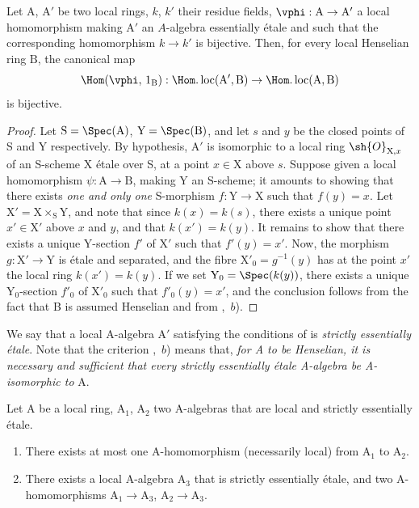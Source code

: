 \begin{lemma}[18.6.2]
\label{IV.18.6.2}
Let $\mathrm{A}$, $\mathrm{A}'$ be two local rings, $k$, $k'$ their residue fields,
$\vphi:\mathrm{A}\to\mathrm{A}'$ a local homomorphism making $\mathrm{A}'$ an $A$-algebra essentially \'{e}tale 
and such that the corresponding homomorphism $k\to k'$ is bijective.
Then, for every local Henselian ring $\mathrm{B}$, the canonical map
\[
  \Hom(\vphi,\,1_{\mathrm{B}}):\Hom.\operatorname{loc}(\mathrm{A}',\mathrm{B})\to\Hom.\operatorname{loc}(\mathrm{A},\mathrm{B})
\]
is bijective.
\end{lemma}

\begin{proof}
Let $\mathrm{S}=\Spec(\mathrm{A})$, $\mathrm{Y}=\Spec(\mathrm{B})$, and let $s$ and $y$ be the closed points of S and Y respectively.
By hypothesis, $\mathrm{A}'$ is isomorphic to a local ring $\sh{O}_{\mathrm{X},x}$ of an S-scheme X \'{e}tale over S, at a point $x\in\mathrm{X}$ above $s$.
Suppose given a local homomorphism $\psi:\mathrm{A}\to\mathrm{B}$, making Y an S-scheme;
it amounts to showing that there exists \emph{one and only one} S-morphism $f:\mathrm{Y}\to\mathrm{X}$ such that $f(y)=x$.
Let $\mathrm{X}'=\mathrm{X}\times_{\mathrm{S}}\mathrm{Y}$, and note that since $k(x)=k(s)$, there exists a unique point $x'\in\mathrm{X}'$ above $x$ and $y$, and that $k(x')=k(y)$.
It remains to show that there exists a unique Y-section $f'$ of $\mathrm{X}'$ such that $f'(y)=x'$.
Now, the morphism $g:\mathrm{X}'\to\mathrm{Y}$ is \'{e}tale and separated, and the fibre $\mathrm{X}'_0=g^{-1}(y)$ has at the point $x'$ the local ring $k(x')=k(y)$.
If we set $\mathrm{Y}_0=\Spec(k(y))$, there exists a unique $\mathrm{Y}_0$-section $f'_0$ of $\mathrm{X}'_0$ such that $f'_0(y)=x'$, and the conclusion follows from the fact that B is assumed Henselian and from ,~$b$).
\end{proof}

We say that a local A-algebra $\mathrm{A}'$ satisfying the conditions of  is \emph{strictly essentially \'{e}tale}.
Note that the criterion ,~$b$) means that, \emph{for A to be Henselian, it is necessary and sufficient that every strictly essentially \'{e}tale A-algebra be A-isomorphic to} A.

\begin{lemma}[18.6.3]
\label{IV.18.6.3}
Let $\mathrm{A}$ be a local ring, $\mathrm{A}_1$, $\mathrm{A}_2$ two A-algebras that are local and strictly essentially \'{e}tale.
\begin{enumerate}[label=\emph{\roman*)}]
  \item There exists at most one A-homomorphism (necessarily local) from $\mathrm{A}_1$ to $\mathrm{A}_2$.
  \item There exists a local A-algebra $\mathrm{A}_3$ that is strictly essentially \'{e}tale, and two A-homomorphisms $\mathrm{A}_1\to\mathrm{A}_3$, $\mathrm{A}_2\to\mathrm{A}_3$.
\end{enumerate}
\end{lemma}

